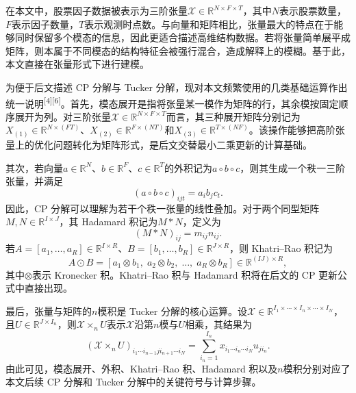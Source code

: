 在本文中，股票因子数据被表示为三阶张量$\mathcal{X}\in\mathbb{R}^{N\times F\times T}$，其中$N$表示股票数量，$F$表示因子数量，$T$表示观测时点数。与向量和矩阵相比，张量最大的特点在于能够同时保留多个模态的信息，因此更适合描述高维结构数据。若将张量简单展平成矩阵，则本属于不同模态的结构特征会被强行混合，造成解释上的模糊。基于此，本文直接在张量形式下进行建模。

为便于后文描述 CP 分解与 Tucker 分解，现对本文频繁使用的几类基础运算作出统一说明\textsuperscript{[4][6]}。首先，模态展开是指将张量某一模作为矩阵的行，其余模按固定顺序展开为列。对三阶张量$\mathcal{X}\in\mathbb{R}^{N\times F\times T}$而言，其三种展开矩阵分别记为$X_{(1)}\in\mathbb{R}^{N\times (FT)}$、$X_{(2)}\in\mathbb{R}^{F\times (NT)}$和$X_{(3)}\in\mathbb{R}^{T\times (NF)}$。该操作能够把高阶张量上的优化问题转化为矩阵形式，是后文交替最小二乘更新的计算基础。

其次，若向量$a\in\mathbb{R}^{N}$、$b\in\mathbb{R}^{F}$、$c\in\mathbb{R}^{T}$的外积记为$a\circ b\circ c$，则其生成一个秩一三阶张量，并满足
\begin{equation}
\left(a\circ b\circ c\right)_{ijt}=a_i b_j c_t.
\end{equation}
因此，CP 分解可以理解为若干个秩一张量的线性叠加。对于两个同型矩阵$M,N\in\mathbb{R}^{I\times J}$，其 Hadamard 积记为$M\ast N$，定义为
\begin{equation}
\left(M\ast N\right)_{ij}=m_{ij}n_{ij}.
\end{equation}
若$A=[a_1,\ldots,a_R]\in\mathbb{R}^{I\times R}$、$B=[b_1,\ldots,b_R]\in\mathbb{R}^{J\times R}$，则 Khatri--Rao 积记为
\begin{equation}
A\odot B=\left[a_1\otimes b_1,\;a_2\otimes b_2,\;\ldots,\;a_R\otimes b_R\right]\in\mathbb{R}^{(IJ)\times R},
\end{equation}
其中$\otimes$表示 Kronecker 积。Khatri--Rao 积与 Hadamard 积将在后文的 CP 更新公式中直接出现。

最后，张量与矩阵的$n$模积是 Tucker 分解的核心运算。设$\mathcal{X}\in\mathbb{R}^{I_1\times\cdots\times I_n\times\cdots\times I_N}$，且$U\in\mathbb{R}^{J\times I_n}$，则$\mathcal{X}\times_n U$表示$\mathcal{X}$沿第$n$模与$U$相乘，其结果为
\begin{equation}
\left(\mathcal{X}\times_n U\right)_{i_1\cdots i_{n-1}ji_{n+1}\cdots i_N}
=\sum_{i_n=1}^{I_n}x_{i_1\cdots i_n\cdots i_N}u_{ji_n}.
\end{equation}
由此可见，模态展开、外积、Khatri--Rao 积、Hadamard 积以及$n$模积分别对应了本文后续 CP 分解和 Tucker 分解中的关键符号与计算步骤。

